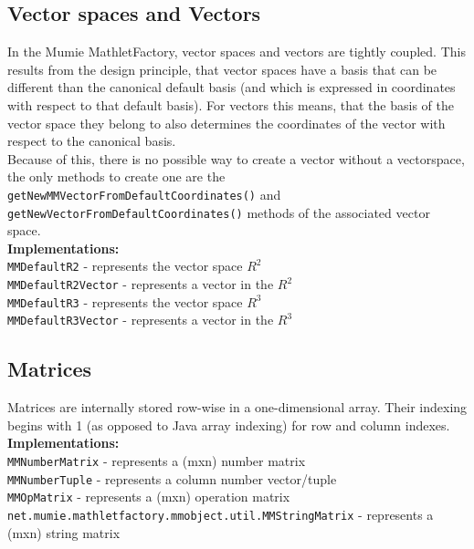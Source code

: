 \documentclass[a4paper,12pt]{book}
\begin{document}
\begin{appendix}
    \subsection{Vector spaces and Vectors}
	In the Mumie MathletFactory, vector spaces and vectors are tightly coupled. This results from the
	design principle, that vector spaces have a basis that can be different than the canonical default
 	basis (and which is expressed in coordinates with respect to that default basis). For vectors this 
	means, that the basis of the vector space they belong to also determines the coordinates of the 
	vector with respect to the canonical basis.\\
	Because of this, there is no possible way to create a vector without a vectorspace, the only methods
	to create one are the \verb|getNewMMVectorFromDefaultCoordinates()| and \verb|getNewVectorFromDefaultCoordinates()|
	methods of the associated vector space.\\
      {\bf Implementations:}\\
        \verb|MMDefaultR2| - represents the vector space $R^2$\\
        \verb|MMDefaultR2Vector| - represents a vector in the $R^2$\\
        \verb|MMDefaultR3| - represents the vector space $R^3$\\
        \verb|MMDefaultR3Vector| - represents a vector in the $R^3$
	
    \subsection{Matrices}
    Matrices are internally stored row-wise in a one-dimensional array. Their indexing begins
    with 1 (as opposed to Java array indexing) for row and column indexes.\\
      {\bf Implementations:}\\
        \verb|MMNumberMatrix| - represents a (mxn) number matrix \\
        \verb|MMNumberTuple| - represents a column number vector/tuple \\
        \verb|MMOpMatrix| - represents a (mxn) operation matrix \\
        \verb|net.mumie.mathletfactory.mmobject.util.MMStringMatrix| - represents a (mxn) string matrix 
        

\end{appendix}
\end{document}
